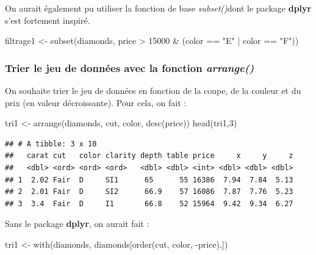 \documentclass[
]{book}
\newenvironment{Shaded}{\begin{snugshade}}{\end{snugshade}}
\newcommand{\DecValTok}[1]{\textcolor[rgb]{0.00,0.00,0.81}{#1}}
\newcommand{\FunctionTok}[1]{\textcolor[rgb]{0.00,0.00,0.00}{#1}}
\newcommand{\NormalTok}[1]{#1}
\newcommand{\OtherTok}[1]{\textcolor[rgb]{0.56,0.35,0.01}{#1}}
\newcommand{\SpecialCharTok}[1]{\textcolor[rgb]{0.00,0.00,0.00}{#1}}
\newcommand{\StringTok}[1]{\textcolor[rgb]{0.31,0.60,0.02}{#1}}
\theoremstyle{definition}
\theoremstyle{definition}
\theoremstyle{definition}
\theoremstyle{definition}
\theoremstyle{remark}
\begin{document}
On aurait également pu utiliser la fonction de base \emph{subset()}dont le package \textbf{dplyr} s'est fortement inspiré.

\begin{Shaded}
\begin{Highlighting}[]
\NormalTok{filtrage1 }\OtherTok{\textless{}{-}} \FunctionTok{subset}\NormalTok{(diamonds, price }\SpecialCharTok{\textgreater{}} \DecValTok{15000} \SpecialCharTok{\&}\NormalTok{ (color }\SpecialCharTok{==} \StringTok{"E"} \SpecialCharTok{|}\NormalTok{ color }\SpecialCharTok{==} \StringTok{"F"}\NormalTok{))}
\end{Highlighting}
\end{Shaded}

\hypertarget{trier-le-jeu-de-donnuxe9es-avec-la-fonction-arrange}{%
\subsubsection{\texorpdfstring{Trier le jeu de données avec la fonction \emph{arrange()}}{Trier le jeu de données avec la fonction arrange()}}\label{trier-le-jeu-de-donnuxe9es-avec-la-fonction-arrange}}

On souhaite trier le jeu de données en fonction de la coupe, de la couleur et du prix (en valeur décroissante). Pour cela, on fait :

\begin{Shaded}
\begin{Highlighting}[]
\NormalTok{tri1 }\OtherTok{\textless{}{-}} \FunctionTok{arrange}\NormalTok{(diamonds, cut, color, }\FunctionTok{desc}\NormalTok{(price))}
\FunctionTok{head}\NormalTok{(tri1,}\DecValTok{3}\NormalTok{)}
\end{Highlighting}
\end{Shaded}

\begin{verbatim}
## # A tibble: 3 x 10
##   carat cut   color clarity depth table price     x     y     z
##   <dbl> <ord> <ord> <ord>   <dbl> <dbl> <int> <dbl> <dbl> <dbl>
## 1  2.02 Fair  D     SI1      65      55 16386  7.94  7.84  5.13
## 2  2.01 Fair  D     SI2      66.9    57 16086  7.87  7.76  5.23
## 3  3.4  Fair  D     I1       66.8    52 15964  9.42  9.34  6.27
\end{verbatim}

Sans le package \textbf{dplyr}, on aurait fait :

\begin{Shaded}
\begin{Highlighting}[]
\NormalTok{tri1 }\OtherTok{\textless{}{-}} \FunctionTok{with}\NormalTok{(diamonds, diamonds[}\FunctionTok{order}\NormalTok{(cut, color, }\SpecialCharTok{{-}}\NormalTok{price),])}
\end{Highlighting}
\end{Shaded}
\end{document}
